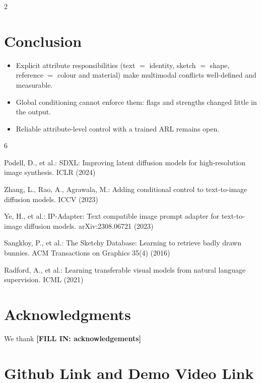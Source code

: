 \documentclass[a1,portrait]{a0poster}
\begin{document}
\begin{minipage}[c]{\linewidth}
\begin{framed}
\begin{multicols}{2}
\section*{Conclusion}
\begin{itemize}
	\item Explicit attribute responsibilities (text $=$ identity, sketch $=$ shape, reference $=$ colour and material) make multimodal conflicts well-defined and measurable.
	\item Global conditioning cannot enforce them: flags and strengths changed little in the output.
	\item Reliable attribute-level control with a trained ARL remains open.
\end{itemize}
\begin{thebibliography}{6}

Podell, D., et al.: SDXL: Improving latent diffusion models for high-resolution image synthesis. ICLR (2024)

Zhang, L., Rao, A., Agrawala, M.: Adding conditional control to text-to-image diffusion models. ICCV (2023)

Ye, H., et al.: IP-Adapter: Text compatible image prompt adapter for text-to-image diffusion models. arXiv:2308.06721 (2023)

Sangkloy, P., et al.: The Sketchy Database: Learning to retrieve badly drawn bunnies. ACM Transactions on Graphics 35(4) (2016)

Radford, A., et al.: Learning transferable visual models from natural language supervision. ICML (2021)

\end{thebibliography}
\section*{Acknowledgments}
\small \textnormal{We thank \textbf{[FILL IN: acknowledgements]}}

\section*{Github Link and Demo Video Link}
\vspace{-0.5cm}


\end{multicols}
\end{framed}
\end{minipage}
\end{document}
